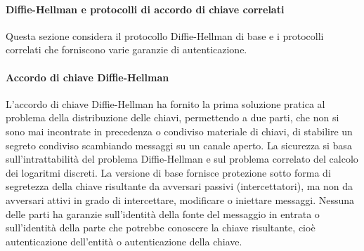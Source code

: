 \documentclass{article}
\theoremstyle{definition}
\begin{document}
\paragraph{Diffie-Hellman e protocolli di accordo di chiave correlati}

Questa sezione considera il protocollo Diffie-Hellman di base e i protocolli correlati che forniscono varie garanzie di autenticazione.

\paragraph{Accordo di chiave Diffie-Hellman}
L'accordo di chiave Diffie-Hellman ha fornito la prima soluzione pratica al problema della distribuzione delle chiavi, permettendo a due parti, che non si sono mai incontrate in precedenza o condiviso materiale di chiavi, di stabilire un segreto condiviso scambiando messaggi su un canale aperto. La sicurezza si basa sull'intrattabilità del problema Diffie-Hellman e sul problema correlato del calcolo dei logaritmi discreti. La versione di base fornisce protezione sotto forma di segretezza della chiave risultante da avversari passivi (intercettatori), ma non da avversari attivi in grado di intercettare, modificare o iniettare messaggi. Nessuna delle parti ha garanzie sull'identità della fonte del messaggio in entrata o sull'identità della parte che potrebbe conoscere la chiave risultante, cioè autenticazione dell'entità o autenticazione della chiave.
\end{document}
